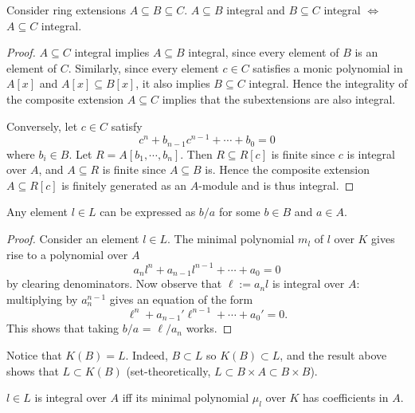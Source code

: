 \begin{theorem}{\label{integrality-trans}}
  Consider ring extensions $A \subseteq B \subseteq C$. $A \subseteq B$ integral
  and $B \subseteq C$ integral $\iff$ $A \subseteq C$ integral.
\end{theorem}
\begin{proof}
  $A \subseteq C$ integral implies $A \subseteq B$ integral, since every
  element of $B$ is an element of $C$. Similarly, since every element $c\in C$
  satisfies a monic polynomial in $A[x]$ and $A[x] \subseteq B[x]$, it also
  implies $B \subseteq C$ integral. Hence the integrality of the composite
  extension $A\subseteq C$ implies that the subextensions are also integral.

  \medskip\noindent Conversely, let $c\in C$ satisfy \[ c^n + b_{n-1}c^{n-1} +
  \cdots + b_0 = 0 \] where $b_i\in B$. Let $R = A[b_1,\cdots,b_n]$. Then
  $R \subseteq {R[c]}$ is finite since $c$ is integral over $A$, and
  $A \subseteq R$ is finite since $A \subseteq B$ is. Hence the
  composite extension $A \subseteq R[c]$ is finitely generated as an
  $A$-module and is thus integral.
\end{proof}

\begin{theorem}
  Any element $l \in L$ can be expressed as $b/a$ for some $b \in B$ and $a \in A$.
\end{theorem}

\begin{proof}
  Consider an element $l \in L$. The minimal polynomial $m_l$ of $l$ over $K$
  gives rise to a polynomial over $A$
  \[ a_nl^n + a_{n-1}l^{n-1} + \cdots + a_0 = 0 \] by clearing denominators. Now
  observe that $\ell := a_nl$ is integral over $A$: multiplying by $a_n^{n-1}$
  gives an equation of the form
  \[ \ell^n + a_{n-1}'\ell^{n-1} + \cdots + a_0' = 0. \] This shows that taking
  $b/a$ = $\ell/a_n$ works.
\end{proof}

\begin{remark}
  Notice that $K(B) = L$. Indeed, $B \subset L$ so $K(B) \subset L$, and the
  result above shows that $L \subset K(B)$ (set-theoretically, $L \subset B
  \times A \subset B \times B$).
\end{remark}

\begin{theorem}
  $l \in L$ is integral over $A$ iff its minimal polynomial $\mu_l$ over $K$ has
  coefficients in $A$.
\end{theorem}

